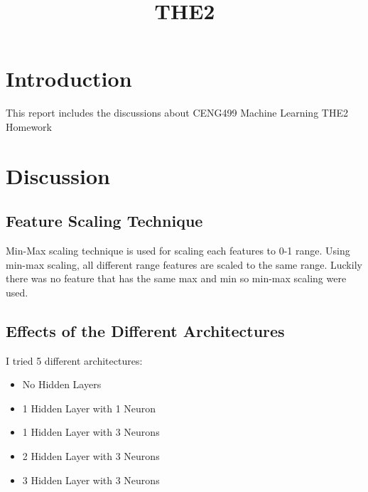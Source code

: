 \documentclass[conference]{IEEEtran}
\begin{document}
    \title{THE2\\
    }

    \author{
    }

    \maketitle


    \section{Introduction}
    This report includes the discussions about CENG499 Machine Learning THE2 Homework \\

    \section{Discussion}

    \subsection{Feature Scaling Technique}

    Min-Max scaling technique is used for scaling each features to 0-1 range. Using min-max scaling, all different range features are scaled to the same range. Luckily there was no feature that has the same max and min so min-max scaling were used.

    \subsection{Effects of the Different Architectures}

    I tried 5 different architectures:\\
    \begin{itemize}
        \item No Hidden Layers
        \item 1 Hidden Layer with 1 Neuron
        \item 1 Hidden Layer with 3 Neurons
        \item 2 Hidden Layer with 3 Neurons
        \item 3 Hidden Layer with 3 Neurons
    \end{itemize}
\end{document}
